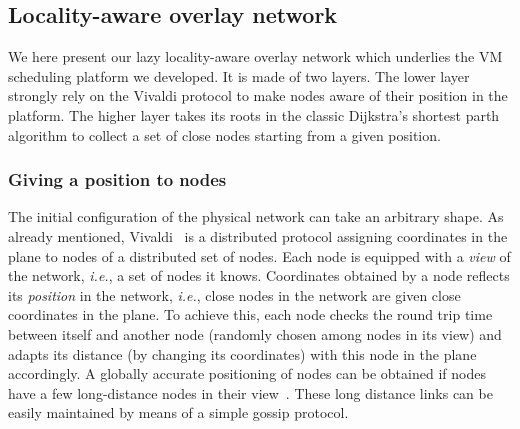 

\subsection{Locality-aware  overlay network}


We here present our lazy locality-aware overlay network which underlies the VM
scheduling platform we developed. It is made of two layers. The lower layer
strongly rely on the Vivaldi protocol to make nodes aware of their position in
the platform. The higher layer takes its roots in the classic Dijkstra's
shortest parth algorithm to collect a set of close nodes starting from a given
position.


\subsubsection*{Giving a position to nodes}

The initial configuration of the physical network can take an arbitrary
shape. As already mentioned, Vivaldi~\cite{dabek:2001:sigcomm04} is a
distributed protocol assigning coordinates in the plane to nodes of a
distributed set of nodes. Each node is equipped with a \emph{view} of the
network, \emph{i.e.}, a set of nodes it knows. Coordinates obtained by a node
reflects its \emph{position} in the network, \emph{i.e.}, close nodes in the
network are given close coordinates in the plane. To achieve this, each node
checks the round trip time between itself and another node (randomly chosen
among nodes in its view) and adapts its distance (by changing its coordinates)
with this node in the plane accordingly. %
A globally accurate positioning of nodes can be
obtained if nodes have a few long-distance nodes in their
view~\cite{dabek:2001:sigcomm04}. These long distance links can be easily
maintained by means of a simple gossip protocol.


